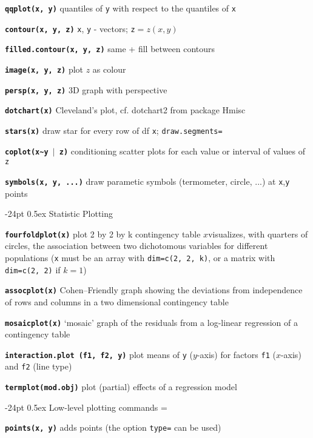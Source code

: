 \documentclass[8pt,landscape]{article}
\makeatletter
\renewcommand\section{\@startsection{section}{1}{0mm}%
                                     {-24pt}%
                                     {0.5ex}%
                                {\color{blue}\normalfont\large\bfseries}}
\newcommand{\code}{\texttt}
\newcommand{\bcode}[1]{\texttt{\textbf{#1}}}
\makeatother
\begin{document}
\begin{multicols*}{3}
\bcode{qqplot(x, y)}  quantiles of \code{y} with respect to the quantiles of \code{x}

\bcode{contour(x, y, z)}  \code{x}, \code{y} - vectors; \code{z}$=z(x,y)$

\bcode{filled.contour(x, y, z)}  same + fill between contours

\bcode{image(x, y, z)}  plot $z$ as colour

\bcode{persp(x, y, z)}  3D graph with perspective 

\bcode{dotchart(x)}  Cleveland's plot, cf. dotchart2 from package Hmisc

\bcode{stars(x)}  draw star for every row of df \code{x}; \code{draw.segments=}

\bcode{coplot(x\~{}y $\mid$ z)}  conditioning scatter plots for each value or interval of values of \code{z}

\bcode{symbols(x, y, ...)}  draw parametic symbols (termometer, circle, ...) at \code{x},\code{y} points



\section{Statistic Plotting}


\bcode{fourfoldplot(x)}  plot 2 by 2 by k contingency table $x$visualizes, with quarters of circles, the association between two dichotomous variables for different populations (\code{x} must be an array with \code{dim=c(2, 2, k)}, or a matrix with \code{dim=c(2, 2)} if $k=1$)

\bcode{assocplot(x)}  Cohen--Friendly graph showing the deviations  from independence of rows and columns in a two dimensional contingency table

\bcode{mosaicplot(x)}  `mosaic' graph of the residuals from a log-linear regression of a contingency table

\bcode{interaction.plot (f1, f2, y)}  plot means of \code{y} ($y$-axis) for factors \code{f1} ($x$-axis) and \code{f2} (line type) 


\bcode{termplot(mod.obj)}  plot (partial) effects of a regression model

\vspace{-5ex}
\section{Low-level plotting commands}
\everypar={\hangindent=9mm}

\bcode{points(x, y)}  adds points (the option \code{type=} can be used)


\end{multicols*}
\end{document}
